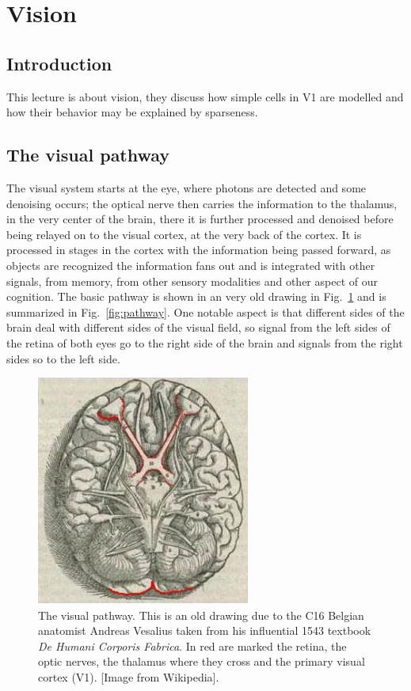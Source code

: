 \documentclass[11pt,a4paper]{scrartcl}
\begin{document}
\section*{Vision}

\subsection*{Introduction} 
This lecture is about vision, they discuss how simple cells in V1 are
modelled and how their behavior may be explained by sparseness.

\subsection*{The visual pathway}
The visual system starts at the eye, where photons are detected and
some denoising occurs; the optical nerve then carries the information
to the thalamus, in the very center of the brain, there it is further
processed and denoised before being relayed on to the visual cortex,
at the very back of the cortex. It is processed in stages in the
cortex with the information being passed forward, as objects are
recognized the information fans out and is integrated with other
signals, from memory, from other sensory modalities and other aspect
of our cognition. The basic pathway is shown in an very old drawing in
Fig.~\ref{fig:Fabrica} and is summarized in
Fig.~\ref{fig:pathway}. One notable aspect is that different sides of
the brain deal with different sides of the visual field, so signal
from the left sides of the retina of both eyes go to the right side of
the brain and signals from the right sides so to the left side.

\begin{figure}
\begin{center}
\includegraphics[width=7cm]{Fabrica_VisualSystem.jpg}
\end{center}
\caption{The visual pathway. This is an old drawing due to the C16
  Belgian anatomist Andreas Vesalius taken from his influential 1543
  textbook \textsl{De Humani Corporis Fabrica}. In red are marked the
  retina, the optic nerves, the thalamus where they cross and the
  primary visual cortex (V1). [Image from Wikipedia].\label{fig:Fabrica}}
\end{figure}
\end{document}
